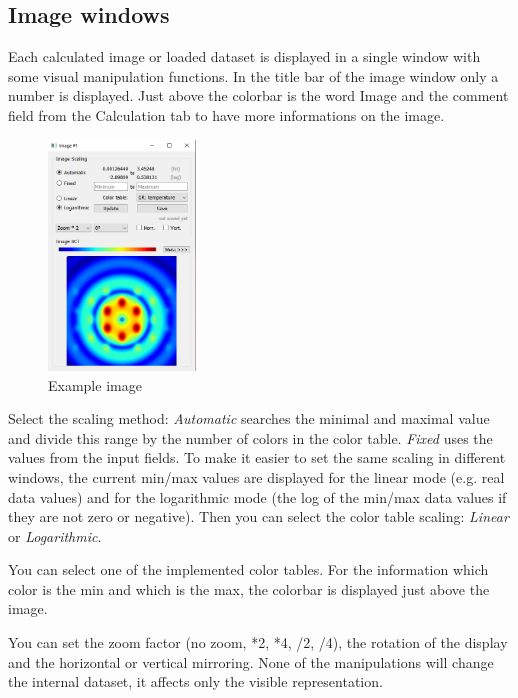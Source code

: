 \documentclass[11pt]{article} %
\begin{document}
\clearpage

\subsection{Image windows}

Each calculated image or loaded dataset is displayed in a single window with some visual manipulation functions. In the title bar of the image window only a number is displayed. Just above the colorbar is the word Image and the comment field from the Calculation tab to have more informations on the image.
\begin{figure}
  \begin{center}
    \includegraphics[width=0.35\textwidth]{img-bct.png}
  \end{center}
 \caption{Example image}
 \label{fig:img1}
\end{figure}
Select the scaling method: {\it Automatic} searches the minimal and maximal value and divide this range by the number of colors in the color table. {\it Fixed} uses the values from the input fields. To make it easier to set the same scaling in different windows, the current min/max values are displayed for the linear mode (e.g. real data values) and for the logarithmic mode (the log of the min/max data values if they are not zero or negative). Then you can select the color table scaling: {\it Linear} or {\it Logarithmic}.

You can select one of the implemented color tables. For the information which color is the min and which is the max, the colorbar is displayed just above the image.

You can set the zoom factor (no zoom, *2, *4, /2, /4), the rotation of the display and the horizontal or vertical mirroring. None of the manipulations will change the internal dataset, it affects only the visible representation.
\end{document}
